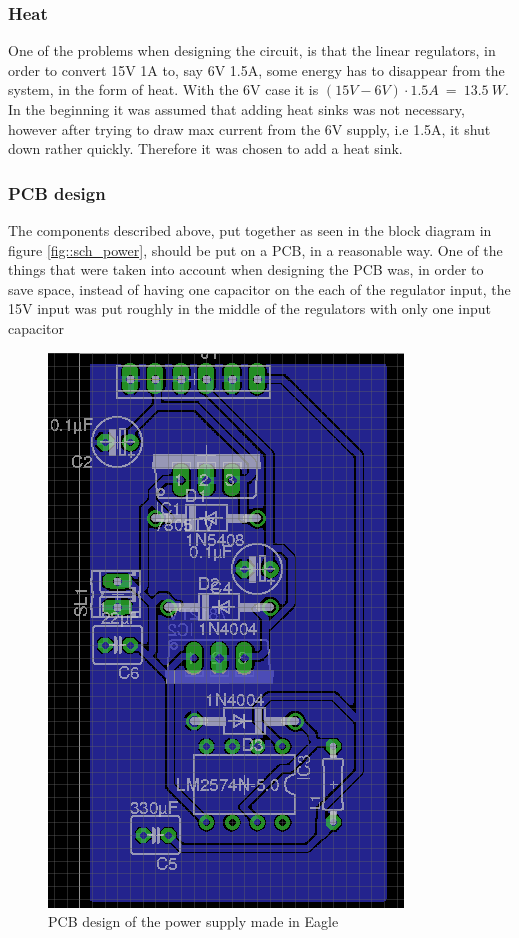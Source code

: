 \subsubsection{Heat}
One of the problems when designing the circuit, is that the linear regulators, in order to convert 15V 1A to, say 6V 1.5A, some energy has to disappear from the system, in the form of heat. With the 6V case it is $(15V - 6V)\cdot 1.5A\ =\ 13.5\ W$. In the beginning it was assumed that adding heat sinks was not necessary, however after trying to draw max current from the 6V supply, i.e 1.5A, it shut down rather quickly. Therefore it was chosen to add a heat sink. 

\subsubsection{PCB design}
The components described above, put together as seen in the block diagram in figure \ref{fig::sch_power}, should be put on a PCB, in a reasonable way. One of the things that were taken into account when designing the PCB was, in order to save space, instead of having one capacitor on the each of the regulator input, the 15V input was put roughly in the middle of the regulators with only one input capacitor

\begin{figure}
\centering
\includegraphics[scale=0.5]{img/pcb_power.png}
\caption{PCB design of the power supply made in Eagle} 
\label{fig::pcb_power}
\end{figure}